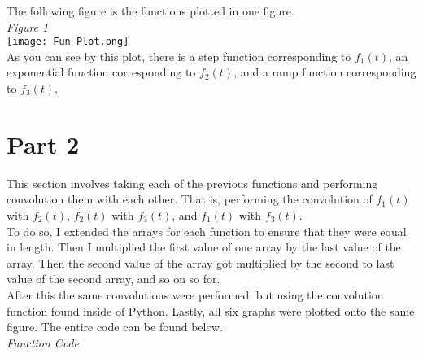 \documentclass[12pt,a4paper]{article}
\begin{document}
\newpage
The following figure is the functions plotted in one figure.\\
\textit{Figure 1}\\
\texttt{[image: Fun Plot.png]}
\\
As you can see by this plot, there is a step function corresponding to $f_1 (t)$, an exponential function corresponding to $f_2 (t)$, and a ramp function corresponding to $f_3 (t)$.

\section{Part 2}
This section involves taking each of the previous functions and performing convolution them with each other. That is, performing the convolution of $f_1 (t)$ with $f_2 (t)$, $f_2 (t)$ with $f_3 (t)$, and $f_1 (t)$ with $f_3 (t)$.\\
To do so, I extended the arrays for each function to ensure that they were equal in length. Then I multiplied the first value of one array by the last value of the array. Then the second value of the array got multiplied by the second to last value of the second array, and so on so for.\\
After this the same convolutions were performed, but using the convolution function found inside of Python. Lastly, all six graphs were plotted onto the same figure. The entire code can be found below.\\
\textit{Function Code}
\end{document}
